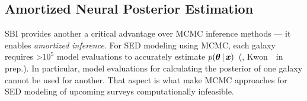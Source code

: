 

\subsection{Amortized Neural Posterior Estimation} \label{sec:flow}
SBI provides another a critical advantage over MCMC
inference methods --- it enables \emph{amortized inference}. 
For SED modeling using MCMC, each galaxy requires >$10^5$ model evaluations to
accurately estimate $p(\boldsymbol{\theta} \,|\, \textbf{\textit{x}})$~(\citealt{hahn2022}, Kwon~\etal~in
prep.).
In particular, model evaluations for calculating the posterior of one galaxy cannot
be used for another. 
That aspect is what make MCMC approaches for SED modeling of upcoming surveys
computationally infeasible.



